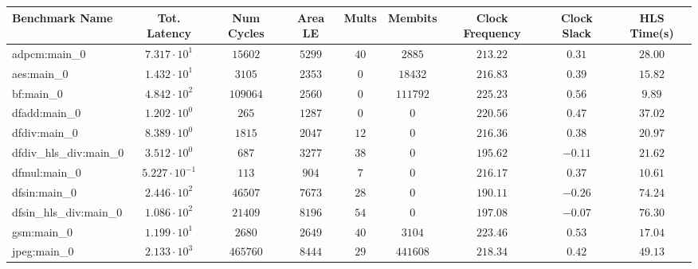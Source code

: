 \begin{tabular}{|l|c|c|c|c|c|c|c|c|}
\hline
Benchmark Name          & Tot. Latency            & Num Cycles & Area LE   & Mults   & Membits    & Clock Frequency & Clock Slack & HLS Time(s) \\
\hline
adpcm:main\_0           & $ 7.317 \cdot 10^{1}  $ & $ 15602  $ & $ 5299  $ & $ 40  $ & $ 2885   $ & $ 213.22      $ & $ 0.31    $ & $ 28.00   $ \\
aes:main\_0             & $ 1.432 \cdot 10^{1}  $ & $ 3105   $ & $ 2353  $ & $ 0   $ & $ 18432  $ & $ 216.83      $ & $ 0.39    $ & $ 15.82   $ \\
bf:main\_0              & $ 4.842 \cdot 10^{2}  $ & $ 109064 $ & $ 2560  $ & $ 0   $ & $ 111792 $ & $ 225.23      $ & $ 0.56    $ & $ 9.89    $ \\
dfadd:main\_0           & $ 1.202 \cdot 10^{0}  $ & $ 265    $ & $ 1287  $ & $ 0   $ & $ 0      $ & $ 220.56      $ & $ 0.47    $ & $ 37.02   $ \\
dfdiv:main\_0           & $ 8.389 \cdot 10^{0}  $ & $ 1815   $ & $ 2047  $ & $ 12  $ & $ 0      $ & $ 216.36      $ & $ 0.38    $ & $ 20.97   $ \\
dfdiv\_hls\_div:main\_0 & $ 3.512 \cdot 10^{0}  $ & $ 687    $ & $ 3277  $ & $ 38  $ & $ 0      $ & $ 195.62      $ & $ -0.11   $ & $ 21.62   $ \\
dfmul:main\_0           & $ 5.227 \cdot 10^{-1} $ & $ 113    $ & $ 904   $ & $ 7   $ & $ 0      $ & $ 216.17      $ & $ 0.37    $ & $ 10.61   $ \\
dfsin:main\_0           & $ 2.446 \cdot 10^{2}  $ & $ 46507  $ & $ 7673  $ & $ 28  $ & $ 0      $ & $ 190.11      $ & $ -0.26   $ & $ 74.24   $ \\
dfsin\_hls\_div:main\_0 & $ 1.086 \cdot 10^{2}  $ & $ 21409  $ & $ 8196  $ & $ 54  $ & $ 0      $ & $ 197.08      $ & $ -0.07   $ & $ 76.30   $ \\
gsm:main\_0             & $ 1.199 \cdot 10^{1}  $ & $ 2680   $ & $ 2649  $ & $ 40  $ & $ 3104   $ & $ 223.46      $ & $ 0.53    $ & $ 17.04   $ \\
jpeg:main\_0            & $ 2.133 \cdot 10^{3}  $ & $ 465760 $ & $ 8444  $ & $ 29  $ & $ 441608 $ & $ 218.34      $ & $ 0.42    $ & $ 49.13   $ \\

\end{tabular}
